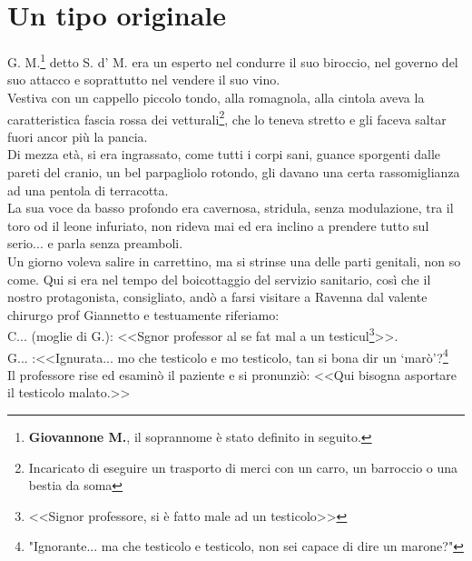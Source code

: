 
\chapter{Un tipo originale} 
G. M.\footnote{\textbf{Giovannone M.}, il soprannome è stato definito in seguito.} detto S. d' M. era un esperto nel condurre il suo biroccio, nel governo del suo attacco e soprattutto nel vendere il suo vino. \\
\indent Vestiva con un cappello piccolo tondo, alla romagnola, alla cintola aveva la caratteristica fascia rossa dei vetturali\footnote{Incaricato di eseguire un trasporto di merci con un carro, un barroccio o una bestia da soma}, che lo teneva stretto e gli faceva saltar fuori ancor più la pancia.\\
\indent Di mezza età, si era ingrassato, come tutti i corpi sani, guance sporgenti dalle pareti del cranio, un bel parpagliolo rotondo, gli davano una certa rassomiglianza ad una pentola di terracotta.\\
\indent La sua voce da basso profondo era cavernosa, stridula, senza modulazione, tra il toro od il leone infuriato, non rideva mai ed era inclino a prendere tutto sul serio... e parla senza preamboli.\\
\indent Un giorno voleva salire in carrettino, ma si strinse una delle parti genitali, non so come. Qui si era nel tempo del boicottaggio del servizio sanitario, così che il nostro protagonista, consigliato, andò a farsi visitare a Ravenna dal valente chirurgo prof Giannetto e testuamente riferiamo:\\
\indent {}C\:.\:.\:. (moglie di G.): <<Sgnor professor al se fat mal a un testicul\footnote{<<Signor professore, si è fatto male ad un testicolo>>}>>.\\
\indent G\:.\:.\:. :<<Ignurata... mo che testicolo e mo testicolo, tan si bona dir un `marò'?\footnote{"Ignorante... ma che testicolo e testicolo, non sei capace di dire un marone?"}\\
\indent Il professore rise ed esaminò il paziente e si pronunziò: <<Qui bisogna asportare il testicolo malato.>>\\
